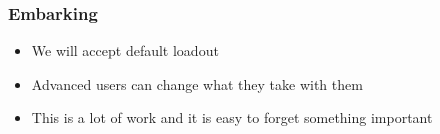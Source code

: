 \begin{frame}
\frametitle{Embarking}
\begin{itemize}
\item We will accept default loadout
\item Advanced users can change what they take with them
\item This is a lot of work and it is easy to forget something important
\end{itemize}
\end{frame}
